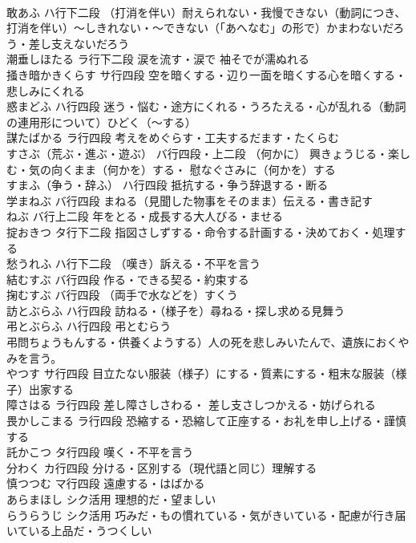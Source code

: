 \documentclass[8pt]{extreport}
\begin{document}
\begin{CJK}{UTF8}{min}
\\	敢あふ		ハ行下二段	（打消を伴い）耐えられない・我慢できない（動詞につき、打消を伴い）～しきれない・～できない（「あへなむ」の形で）かまわないだろう・差し支えないだろう
\\	潮垂しほたる		ラ行下二段	涙を流す・涙で 袖そでが濡ぬれる
\\	掻き暗かきくらす		サ行四段	空を暗くする・辺り一面を暗くする心を暗くする・悲しみにくれる
\\	惑まどふ		ハ行四段	迷う・悩む・途方にくれる・うろたえる・心が乱れる（動詞の連用形について）ひどく（～する）
\\	謀たばかる		ラ行四段	考えをめぐらす・工夫するだます・たくらむ
\\	すさぶ（荒ぶ・進ぶ・遊ぶ）		バ行四段・上二段	（何かに） 興きょうじる・楽しむ・気の向くまま（何かを）する・ 慰なぐさみに（何かを）する
\\	すまふ（争う・辞ふ）		ハ行四段	抵抗する・争う辞退する・断る
\\	学まねぶ		バ行四段	まねる（見聞した物事をそのまま）伝える・書き記す
\\	ねぶ		バ行上二段	年をとる・成長する大人びる・ませる
\\	掟おきつ		タ行下二段	指図さしずする・命令する計画する・決めておく・処理する
\\	愁うれふ		ハ行下二段	（嘆き）訴える・不平を言う
\\	結むすぶ		バ行四段	作る・できる契る・約束する
\\	掬むすぶ		バ行四段	（両手で水などを）すくう
\\	訪とぶらふ		ハ行四段	訪ねる・（様子を）尋ねる・探し求める見舞う
\\	弔とぶらふ		ハ行四段	弔とむらう
\\	弔問ちょうもんする・供養くようする）人の死を悲しみいたんで、遺族におくやみを言う。
\\	やつす		サ行四段	目立たない服装（様子）にする・質素にする・粗末な服装（様子）出家する
\\	障さはる		ラ行四段	差し障さしさわる・ 差し支さしつかえる・妨げられる
\\	畏かしこまる		ラ行四段	恐縮する・恐縮して正座する・お礼を申し上げる・謹慎する
\\	託かこつ		タ行四段	嘆く・不平を言う
\\	分わく		カ行四段	分ける・区別する（現代語と同じ）理解する
\\	慎つつむ		マ行四段	遠慮する・はばかる
\\	あらまほし		シク活用	理想的だ・望ましい
\\	らうらうじ		シク活用	巧みだ・もの慣れている・気がきいている・配慮が行き届いている上品だ・うつくしい

\end{CJK}
\end{document}
